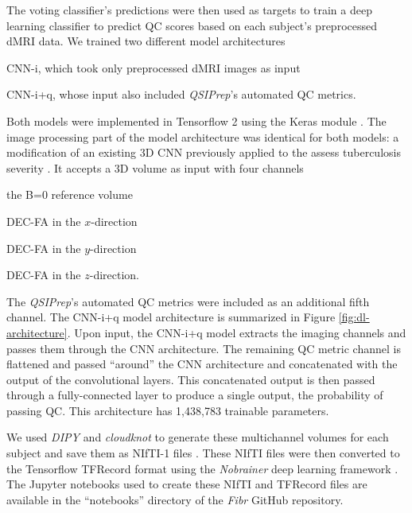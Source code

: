 \documentclass[fleqn,10pt]{wlscirep}
\begin{document}
The voting classifier's predictions were then used as targets to train a deep
learning classifier to predict QC scores based on each subject's preprocessed
dMRI data. We trained two different model architectures
\begin{enumerate*}[%
    label=(\roman*),%
    before=\unskip{: },%
    itemjoin={{, }},%
    itemjoin*={{ and }}]
    \item CNN-i, which took only preprocessed dMRI images as input
    \item CNN-i+q, whose input also included \emph{QSIPrep}'s automated QC metrics.
\end{enumerate*}
Both models were implemented in Tensorflow 2 \cite{tensorflow} using the Keras
module \cite{keras}. The image processing part of the model architecture was
identical for both models: a modification of an existing 3D CNN
\cite{zunair2020-bs} previously applied to the assess tuberculosis severity
\cite{dicente2019clef}. It accepts a 3D volume as input with four channels
\begin{enumerate*}[%
    label=(\roman*),%
    before=\unskip{: },%
    itemjoin={{, }},%
    itemjoin*={{ and }}]
    \item the B=0 reference volume
    \item DEC-FA in the $x$-direction
    \item DEC-FA in the $y$-direction
    \item DEC-FA in the $z$-direction.
\end{enumerate*}
The \emph{QSIPrep}'s automated QC metrics were included as an additional fifth
channel. The CNN-i+q model architecture is summarized in Figure
\ref{fig:dl-architecture}. Upon input, the CNN-i+q model extracts the imaging
channels and passes them through the CNN architecture. The remaining QC metric
channel is flattened and passed ``around'' the CNN architecture and concatenated
with the output of the convolutional layers. This concatenated output is then
passed through a fully-connected layer to produce a single output, the
probability of passing QC. This architecture has 1,438,783 trainable parameters.

We used \emph{DIPY} \cite{dipy} and \emph{cloudknot} \cite{cloudknot} to
generate these multichannel volumes for each subject and save them as NIfTI-1
files \cite{nifti}. These NIfTI files were then converted to the Tensorflow
TFRecord format using the \emph{Nobrainer} deep learning framework
\cite{nobrainer}.
The Jupyter notebooks used to create these NIfTI and TFRecord files are
available in the ``notebooks'' directory of the \emph{Fibr} GitHub
repository.
\end{document}
